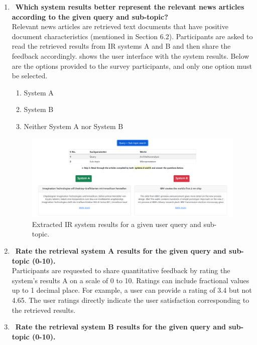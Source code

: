 \begin{enumerate}
	
	\item ~\textbf{Which system results better represent the relevant news articles according to the given query and sub-topic?}  \\
	
Relevant news articles are retrieved text documents that have positive document characteristics (mentioned in Section 6.2). Participants are asked to read the retrieved results from \ac{IR} systems A and B and then share the feedback accordingly.  shows the user interface with the system results. Below are the options provided to the survey participants, and only one option must be selected.

	
	\begin{enumerate}
		\item System A
		\item System B
		\item Neither System A nor System B
	\end{enumerate}
	
	\begin{figure}[h]
		\centering
		\includegraphics[width=.9\textwidth]{images/survey/sub-topic-search-output.png}
		\caption[Extracted \ac{IR} system results.]{Extracted \ac{IR} system results for a given user query and sub-topic. \label{fig:survey_question_2}}
	\end{figure}
	
	\item ~\textbf{Rate the retrieval system A results for the given query and sub-topic (0-10).} \\
	
Participants are requested to share quantitative feedback by rating the system's results A on a scale of 0 to 10. Ratings can include fractional values up to 1 decimal place. For example, a user can provide a rating of 3.4 but not 4.65. The user ratings directly indicate the user satisfaction corresponding to the retrieved results.

	
	\item ~\textbf{Rate the retrieval system B results for the given query and sub-topic (0-10).} \\
	

\end{enumerate}
